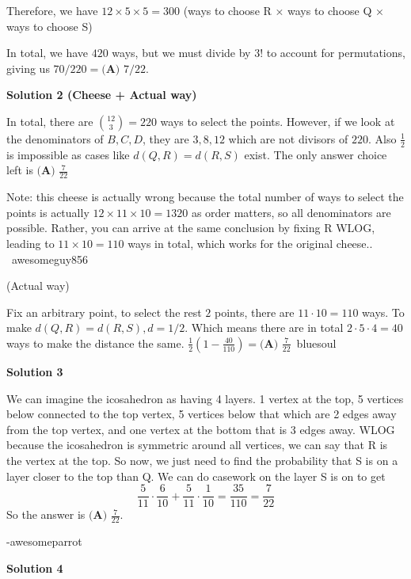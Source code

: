 \begin{enumerate}
 Therefore, we have $12 \times 5 \times 5 = 300$ (ways to choose R × ways to choose Q × ways to choose S)

 In total, we have $420$ ways, but we must divide by $3!$ to account for permutations, giving us $70/220 = \boxed{\textbf{(A) } 7/22}.$




\textbf{Solution 2 (Cheese + Actual way)}

In total, there are $\binom{12}{3}=220$ ways to select the points. However, if we look at the denominators of $B,C,D$, they are $3,8,12$ which are not divisors of $220$. Also $\frac{1}{2}$ is impossible as cases like $d(Q, R) = d(R, S)$ exist. The only answer choice left is $\boxed{\textbf{(A) } \frac{7}{22}}$

 Note: this cheese is actually wrong because the total number of ways to select the points is actually $12 \times 11 \times 10 = 1320$ as order matters, so all denominators are possible. Rather, you can arrive at the same conclusion by fixing R WLOG, leading to $11 \times 10 = 110$ ways in total, which works for the original cheese.. ~awesomeguy856

 (Actual way)

 Fix an arbitrary point, to select the rest $2$ points, there are $11\cdot 10 =110$ ways. To make $d(Q, R)=d(R, S), d=1/2$. Which means there are in total $2\cdot 5 \cdot 4 = 40$ ways to make the distance the same. $\frac{1}{2}(1-\frac{40}{110})= \boxed{\textbf{(A) } \frac{7}{22}}$~bluesoul

 



\textbf{Solution 3}

We can imagine the icosahedron as having 4 layers. 1 vertex at the top, 5 vertices below connected to the top vertex, 5 vertices below that which are 2 edges away from the top vertex, and one vertex at the bottom that is 3 edges away. WLOG because the icosahedron is symmetric around all vertices, we can say that R is the vertex at the top. So now, we just need to find the probability that S is on a layer closer to the top than Q. We can do casework on the layer S is on to get 
 \[\frac{5}{11} \cdot \frac{6}{10} + \frac{5}{11} \cdot \frac{1}{10} = \frac{35}{110} = \frac{7}{22}\]So the answer is $\boxed{\textbf{(A) }\frac{7}{22}}$. 

 -awesomeparrot

 



\textbf{Solution 4}


\end{enumerate}
